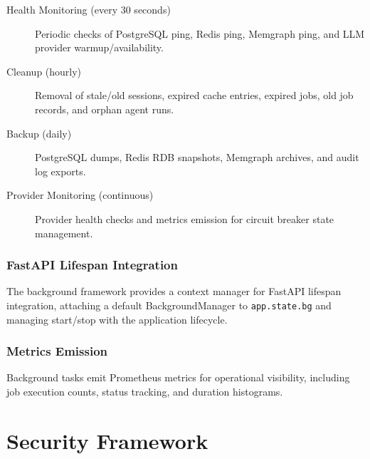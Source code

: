 \documentclass[a4paper,twoside]{sapthesis}
\begin{document}
\begin{description}
    \item[Health Monitoring (every 30 seconds)] Periodic checks of PostgreSQL ping, Redis ping, Memgraph ping, and LLM provider warmup/availability.
    
    \item[Cleanup (hourly)] Removal of stale/old sessions, expired cache entries, expired jobs, old job records, and orphan agent runs.
    
    \item[Backup (daily)] PostgreSQL dumps, Redis RDB snapshots, Memgraph archives, and audit log exports.
    
    \item[Provider Monitoring (continuous)] Provider health checks and metrics emission for circuit breaker state management.
\end{description}

\subsection{FastAPI Lifespan Integration}

The background framework provides a context manager for FastAPI lifespan integration, attaching a default BackgroundManager to \texttt{app.state.bg} and managing start/stop with the application lifecycle.

\subsection{Metrics Emission}

Background tasks emit Prometheus metrics for operational visibility, including job execution counts, status tracking, and duration histograms.



\chapter{Security Framework}
\label{ch:security}

%
\end{document}
